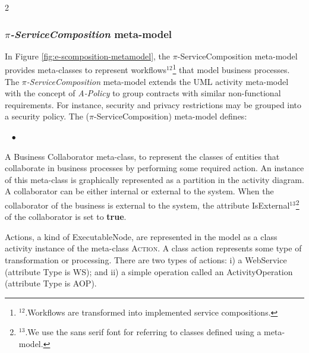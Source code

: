 \documentclass[12pt,twoside]{article}
\theoremstyle{plain}
\theoremstyle{plain}
\newenvironment{itemizedTrivlist}{\begin{list}{\rm ~\hspace{2mm} $\bullet$\ }
                                         {\setlength{\leftmargin}{0pt}
                                          \setlength{\rightmargin}{0pt}
                                          \setlength{\itemindent}{12pt}
                                          \setlength{\listparindent}{0pt}}}
                            {\end{list}}
\begin{document}
\begin{multicols}{2}
\subsubsection{\textit{$\pi$-ServiceComposition} meta-model}%

In Figure \ref{fig:e-scomposition-metamodel}, the $\pi$-Serv\-ice\-Com\-po\-si\-tion meta-model
provides meta-classes to represent workflows$^{12}$\footnote{$^{12}$.Workflows are transformed into implemented service compositions.} that model  business processes.
The \textit{$\pi$-Serv\-ice\-Com\-po\-si\-tion} meta-model extends the UML activity  meta-model with the concept of  \textit{A-Policy}
to group contracts with similar non-functional requirements.
For instance, security and privacy restrictions may be grouped into a security policy.
 The  ($\pi$-Serv\-ice\-Com\-po\-si\-tion) meta-model defines:
\begin{itemizedTrivlist}
\item A {\sc Business Collaborator} meta-class, to represent the classes of entities that collaborate in  business processes by performing some  required action.
An instance of this meta-class is graphically represented as a partition in the activity diagram.
A collaborator can be either internal or external to the system.
When the collaborator of the business is external to the system, the attribute {\sf IsExternal}$^{13}$\footnote{$^{13}$.We use the {\sf sans serif} font for referring to classes defined using a meta-model.} of the collaborator is set to \textbf{true}.

\item {\sc Action}s, a kind of {\sc ExecutableNode}, are represented in the model as a class activity instance of the meta-class \textsc{Action}.
A class action represents some type of transformation or processing.
There are two types of actions: i) a WebService (attribute Type is {\sf WS}); and ii) a simple operation called an {\sc ActivityOperation} (attribute Type is {\sc AOP}).


\end{itemizedTrivlist}
\end{multicols}
\end{document}
